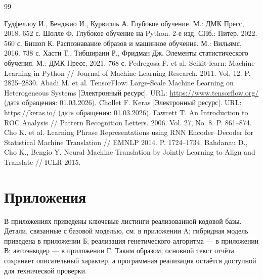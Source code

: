 \documentclass[14pt,a4paper]{extarticle}
\begin{document}
\clearpage
\begin{thebibliography}{99}
 Гудфеллоу И., Бенджио И., Курвилль А. Глубокое обучение. М.: ДМК Пресс, 2018. 652 с.
 Шолле Ф. Глубокое обучение на Python. 2-е изд. СПб.: Питер, 2022. 560 с.
 Бишоп К. Распознавание образов и машинное обучение. М.: Вильямс, 2016. 738 с.
 Хасти Т., Тибширани Р., Фридман Дж. Элементы статистического обучения. М.: ДМК Пресс, 2021. 768 с.
 Pedregosa F. et al. Scikit-learn: Machine Learning in Python // Journal of Machine Learning Research. 2011. Vol. 12. P. 2825--2830.
 Abadi M. et al. TensorFlow: Large-Scale Machine Learning on Heterogeneous Systems [Электронный ресурс]. URL: \url{https://www.tensorflow.org/} (дата обращения: 01.03.2026).
 Chollet F. Keras [Электронный ресурс]. URL: \url{https://keras.io/} (дата обращения: 01.03.2026).
 Fawcett T. An Introduction to ROC Analysis // Pattern Recognition Letters. 2006. Vol. 27, No. 8. P. 861--874.
 Cho K. et al. Learning Phrase Representations using RNN Encoder--Decoder for Statistical Machine Translation // EMNLP 2014. P. 1724--1734.
 Bahdanau D., Cho K., Bengio Y. Neural Machine Translation by Jointly Learning to Align and Translate // ICLR 2015.
\end{thebibliography}

\appendix
\clearpage
\section*{Приложения}
В приложениях приведены ключевые листинги реализованной кодовой базы. Детали, связанные с базовой моделью, см. в приложении A; гибридная модель приведена в приложении Б; реализация генетического алгоритма --- в приложении В; автоэнкодер --- в приложении Г. Таким образом, основной текст отчёта сохраняет описательный характер, а программная реализация остаётся доступной для технической проверки.

\end{document}
